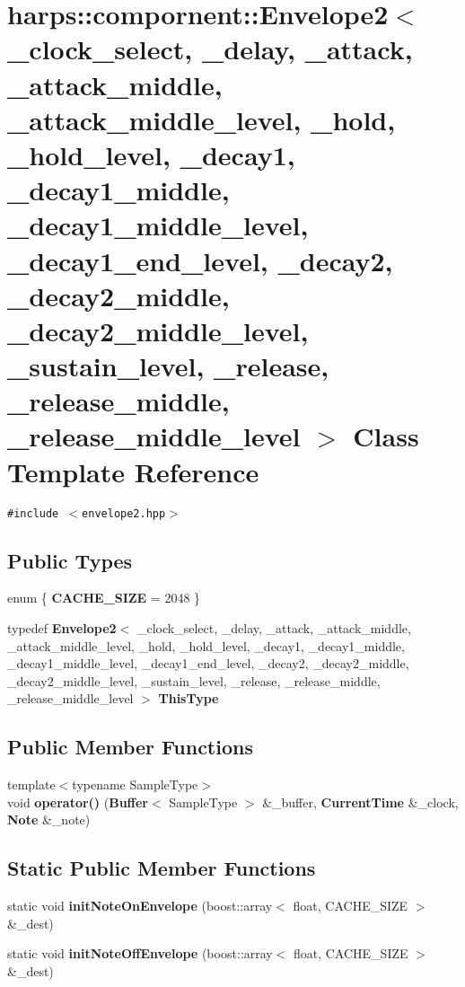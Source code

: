 \section{harps::compornent::Envelope2$<$ \_\-clock\_\-select, \_\-delay, \_\-attack, \_\-attack\_\-middle, \_\-attack\_\-middle\_\-level, \_\-hold, \_\-hold\_\-level, \_\-decay1, \_\-decay1\_\-middle, \_\-decay1\_\-middle\_\-level, \_\-decay1\_\-end\_\-level, \_\-decay2, \_\-decay2\_\-middle, \_\-decay2\_\-middle\_\-level, \_\-sustain\_\-level, \_\-release, \_\-release\_\-middle, \_\-release\_\-middle\_\-level $>$ Class Template Reference}
\label{classharps_1_1compornent_1_1Envelope2}
{\tt \#include $<$envelope2.hpp$>$}

\subsection*{Public Types}
\begin{CompactItemize}
\item 
enum \{ \textbf{CACHE\_\-SIZE} =  2048
 \}
\item 
typedef {\bf Envelope2}$<$ \_\-clock\_\-select, \_\-delay, \_\-attack, \_\-attack\_\-middle, \_\-attack\_\-middle\_\-level, \_\-hold, \_\-hold\_\-level, \_\-decay1, \_\-decay1\_\-middle, \_\-decay1\_\-middle\_\-level, \_\-decay1\_\-end\_\-level, \_\-decay2, \_\-decay2\_\-middle, \_\-decay2\_\-middle\_\-level, \_\-sustain\_\-level, \_\-release, \_\-release\_\-middle, \_\-release\_\-middle\_\-level $>$ \textbf{ThisType}\label{classharps_1_1compornent_1_1Envelope2_1826d375d377d25e54fdb8a24a519f64}

\end{CompactItemize}
\subsection*{Public Member Functions}
\begin{CompactItemize}
\item 
{\footnotesize template$<$typename SampleType$>$ }\\void \textbf{operator()} ({\bf Buffer}$<$ SampleType $>$ \&\_\-buffer, {\bf CurrentTime} \&\_\-clock, {\bf Note} \&\_\-note)\label{classharps_1_1compornent_1_1Envelope2_991902e280a18e0d87744d959259f3cc}

\end{CompactItemize}
\subsection*{Static Public Member Functions}
\begin{CompactItemize}
\item 
static void \textbf{initNoteOnEnvelope} (boost::array$<$ float, CACHE\_\-SIZE $>$ \&\_\-dest)\label{classharps_1_1compornent_1_1Envelope2_f0251b560de2e3a263cd8d0c768293b6}

\item 
static void \textbf{initNoteOffEnvelope} (boost::array$<$ float, CACHE\_\-SIZE $>$ \&\_\-dest)\label{classharps_1_1compornent_1_1Envelope2_e9d3a4889ad359b68b5df6e285626c1e}

\end{CompactItemize}
